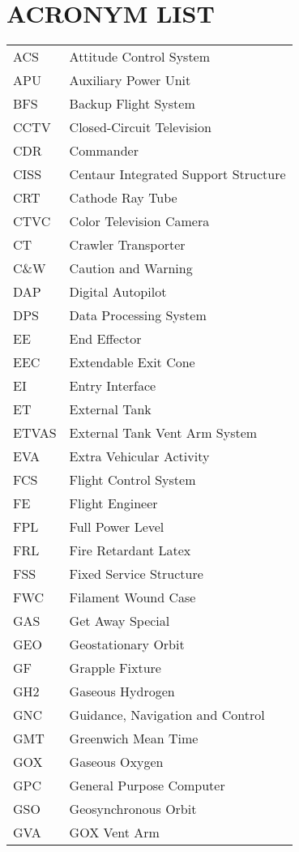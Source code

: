 \documentclass[Space_Shuttle_Vessel_Manual.tex]{subfiles}
\begin{document}
\section{ACRONYM LIST}
\label{sec:acronym-list}
\noindent
\begin{longtable}{l l }
ACS & Attitude Control System\\
APU & Auxiliary Power Unit\\
BFS & Backup Flight System\\
CCTV & Closed-Circuit Television\\
CDR & Commander\\
CISS & Centaur Integrated Support Structure\\
CRT & Cathode Ray Tube\\
CTVC & Color Television Camera\\
CT & Crawler Transporter\\
C\&W & Caution and Warning\\
DAP & Digital Autopilot\\
DPS & Data Processing System\\
EE & End Effector\\
EEC & Extendable Exit Cone\\
EI & Entry Interface\\
ET & External Tank\\
ETVAS & External Tank Vent Arm System\\
EVA & Extra Vehicular Activity\\
FCS & Flight Control System\\
FE & Flight Engineer\\
FPL & Full Power Level\\
FRL & Fire Retardant Latex\\
FSS & Fixed Service Structure\\
FWC & Filament Wound Case\\
GAS & Get Away Special\\
GEO & Geostationary Orbit\\
GF & Grapple Fixture\\
GH2 & Gaseous Hydrogen\\
GNC & Guidance, Navigation and Control\\
GMT & Greenwich Mean Time\\
GOX & Gaseous Oxygen\\
GPC & General Purpose Computer\\
GSO & Geosynchronous Orbit\\
GVA & GOX Vent Arm\\

\end{longtable}
\end{document}

